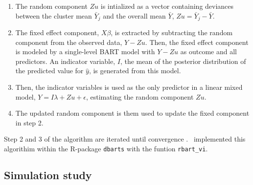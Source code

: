 \documentclass[10pt, a4paper, titlepage]{article}
\begin{document}
\begin{enumerate}
    \item The random component $Zu$ is intialized as a vector containing deviances between the cluster mean $\bar{Y}_j$ and the overall mean $\bar{Y}$, $Zu = \bar{Y}_j - \bar{Y}$.
    \item The fixed effect component, $X\beta$, is extracted by subtracting the random component from the observed data, $Y - Zu$. Then, the fixed effect component is modeled by a single-level BART model with $Y - Zu$ as outcome and all predictors. An indicator variable, $I$, the mean of the posterior distribution of the predicted value for $\hat{y}$, is generated from this model.
    \item Then, the indicator variables is used as the only predictor in a linear mixed model, $Y = I\lambda + Zu + \epsilon$, estimating the random component $Zu$. 
    \item The updated random component is them used to update the fixed component in step 2.
\end{enumerate} Step 2 and 3 of the algorithm are iterated until convergence \citep{chen2020, tan2016}.~\citet{dorie2024} implemented this algorithim within the R-package \texttt{dbarts} with the funtion \texttt{rbart\_vi}.

\subsection{Simulation study}
\end{document}
